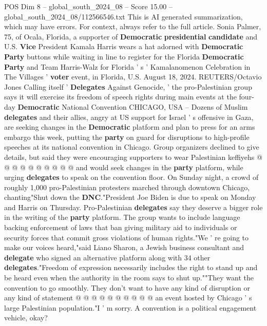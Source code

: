 \begin{textsample}{POS Dim 8 – global\_south\_2024\_08 – Score 15.00 – global\_south\_2024\_08/112566546.txt}  \label{ex:f8_pos_170}
This is AI generated summarization, which may have errors.
For context, always refer to the full article.
Sonia Palmer, 75, of Ocala, Florida, a supporter of \textbf{Democratic} \textbf{presidential} \textbf{candidate} and U.S. \textbf{Vice} President Kamala Harris wears a hat adorned with \textbf{Democratic} \textbf{Party} buttons while waiting in line to register for the Florida \textbf{Democratic} \textbf{Party} and Team Harris-Walz for Florida ' s ' Kamalanomenon Celebration in The Villages ' \textbf{voter} event, in Florida, U.S.
August 18, 2024.
REUTERS/Octavio Jones Calling itself ' \textbf{Delegates} Against Genocide, ' the pro-Palestinian group says it will exercise its freedom of speech rights during main events at the four-day \textbf{Democratic} National Convention CHICAGO, USA -- Dozens of Muslim \textbf{delegates} and their allies, angry at US support for Israel ' s offensive in Gaza, are seeking changes in the \textbf{Democratic} platform and plan to press for an arms embargo this week, putting the \textbf{party} on guard for disruptions to high-profile speeches at its national convention in Chicago.
Group organizers declined to give details, but said they were encouraging supporters to wear Palestinian keffiyehs @ @ @ @ @ @ @ @ @ @ and would seek changes in the \textbf{party} platform, while urging \textbf{delegates} to speak on the convention floor.
On Sunday night, a crowd of roughly 1,000 pro-Palestinian protesters marched through downtown Chicago, chanting"Shut down the \textbf{DNC}."President Joe Biden is due to speak on Monday and Harris on Thursday.
Pro-Palestinian \textbf{delegates} say they deserve a bigger role in the writing of the \textbf{party} platform.
The group wants to include language backing enforcement of laws that ban giving military aid to individuals or security forces that commit gross violations of human rights."We ' re going to make our voices heard,"said Liano Sharon, a Jewish business consultant and \textbf{delegate} who signed an alternative platform along with 34 other \textbf{delegates}."Freedom of expression necessarily includes the right to stand up and be heard even when the authority in the room says to shut up.""They want the convention to go smoothly.
They don't want to have any kind of disruption or any kind of statement @ @ @ @ @ @ @ @ @ @ an event hosted by Chicago ' s large Palestinian population."I ' m sorry.
A convention is a political engagement vehicle, okay?

\end{textsample}
